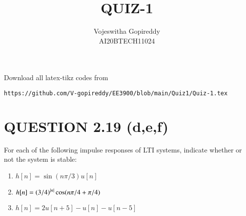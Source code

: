 \documentclass[journal,12pt,twocolumn]{IEEEtran}
\begin{document}
     \def\centbox#1{\makebox[0in]{#1}}
     \def\topbox#1{\raisebox{-\baselineskip}[0in][0in]{#1}}
     \def\midbox#1{\raisebox{-0.5\baselineskip}[0in][0in]{#1}}
\vspace{3cm}
\title{QUIZ-1}
\author{Vojeswitha Gopireddy \\ AI20BTECH11024}
\maketitle
\newpage
\bigskip
\renewcommand{\thefigure}{\theenumi}
\renewcommand{\thetable}{\theenumi}
Download all latex-tikz codes from 
%
\begin{lstlisting}
https://github.com/V-gopireddy/EE3900/blob/main/Quiz1/Quiz-1.tex
\end{lstlisting}
\section{QUESTION 2.19 (d,e,f)}
For each of the following impulse responses of LTI systems, indicate whether or not the system is stable:\\
\begin{enumerate}
    \item $h[n] = \sin(n\pi/3)u[n] $
    \item $h[n] =\left(3/4\right)^{\vert n\vert}\cos(n\pi/4 +\pi/4)$
    \item $h[n] = 2u[n+5] - u[n] - u[n-5]$
\end{enumerate}
%
\end{document}

